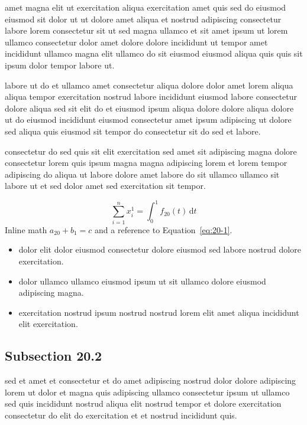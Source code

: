 \documentclass{article}
\begin{document}
amet magna elit ut exercitation aliqua exercitation amet quis sed do eiusmod eiusmod sit dolor ut ut dolore amet aliqua et nostrud adipiscing consectetur labore lorem consectetur sit ut sed magna ullamco et sit amet ipsum ut lorem ullamco consectetur dolor amet dolore dolore incididunt ut tempor amet incididunt ullamco magna elit ullamco do sit eiusmod eiusmod aliqua quis quis sit ipsum dolor tempor labore ut.

labore ut do et ullamco amet consectetur aliqua dolore dolor amet lorem aliqua aliqua tempor exercitation nostrud labore incididunt eiusmod labore consectetur dolore aliqua sed sit elit do et eiusmod ipsum aliqua dolore dolore aliqua dolore ut do eiusmod incididunt eiusmod consectetur amet ipsum adipiscing ut dolore sed aliqua quis eiusmod sit tempor do consectetur sit do sed et labore.

consectetur do sed quis sit elit exercitation sed amet sit adipiscing magna dolore consectetur lorem quis ipsum magna magna adipiscing lorem et lorem tempor adipiscing do aliqua ut labore dolore amet labore do sit ullamco ullamco sit labore ut et sed dolor amet sed exercitation sit tempor.

\begin{equation}\label{eq:20-1}
  \sum_{i=1}^{n} x_i^{1} = \int_0^1 f_{20}(t)\,\mathrm{d}t
\end{equation}
Inline math $a_{20} + b_{1} = c$ and a reference to Equation~\eqref{eq:20-1}.

\begin{itemize}
  \item dolor elit dolor eiusmod consectetur dolore eiusmod sed labore nostrud dolore exercitation.
  \item dolor ullamco ullamco eiusmod ipsum ut sit ullamco dolore eiusmod adipiscing magna.
  \item exercitation nostrud ipsum nostrud nostrud lorem elit amet aliqua incididunt elit exercitation.
\end{itemize}

\subsection{Subsection 20.2}\label{sec:20-2}
sed et amet et consectetur et do amet adipiscing nostrud dolor dolore adipiscing lorem ut dolor et magna quis adipiscing ullamco consectetur ipsum ut ullamco sed quis incididunt nostrud aliqua elit nostrud tempor et dolore exercitation consectetur do elit do exercitation et et nostrud incididunt quis.
\end{document}
